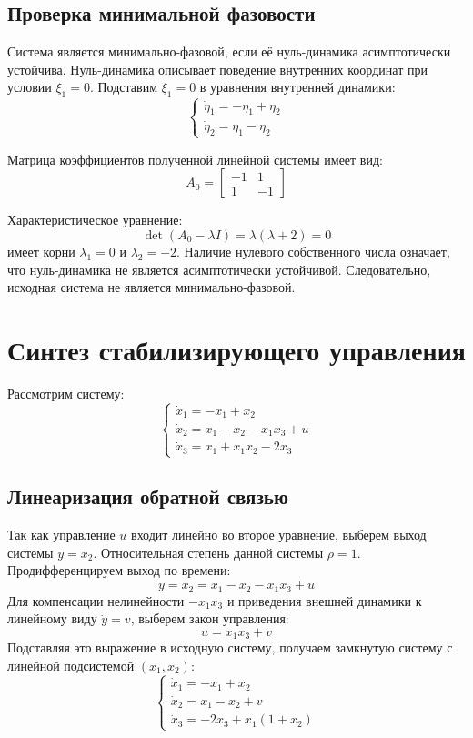 \documentclass[a4paper,12pt]{article}
\begin{document}
\subsection{Проверка минимальной фазовости}

Система является минимально-фазовой, если её нуль-динамика асимптотически устойчива. Нуль-динамика описывает поведение внутренних координат при условии $\xi_1 = 0$. Подставим $\xi_1 = 0$ в уравнения внутренней динамики:
\begin{equation}
	\begin{cases}
		\dot{\eta}_1 = -\eta_1 + \eta_2 \\
		\dot{\eta}_2 = \eta_1 - \eta_2
	\end{cases}
\end{equation}

Матрица коэффициентов полученной линейной системы имеет вид:
$$ A_0 = \begin{bmatrix} -1 & 1 \\ 1 & -1 \end{bmatrix} $$

Характеристическое уравнение: $$\det(A_0 - \lambda I) = \lambda(\lambda + 2) = 0$$ имеет корни $\lambda_1 = 0$ и $\lambda_2 = -2$. Наличие нулевого собственного числа означает, что нуль-динамика не является асимптотически устойчивой. Следовательно, исходная система не является минимально-фазовой.


\section{Синтез стабилизирующего управления}

Рассмотрим систему:
\begin{equation}
	\begin{cases}
		\dot{x}_1 = -x_1 + x_2 \\
		\dot{x}_2 = x_1 - x_2 - x_1 x_3 + u \\
		\dot{x}_3 = x_1 + x_1 x_2 - 2x_3
	\end{cases}
\end{equation}

\subsection{Линеаризация обратной связью}
Так как управление $u$ входит линейно во второе уравнение, выберем выход системы $y = x_2$. Относительная степень данной системы $\rho = 1$. Продифференцируем выход по времени:
$$ \dot{y} = \dot{x}_2 = x_1 - x_2 - x_1 x_3 + u $$
Для компенсации нелинейности $-x_1 x_3$ и приведения внешней динамики к линейному виду $\dot{y} = v$, выберем закон управления:
$$ u = x_1 x_3 + v $$
Подставляя это выражение в исходную систему, получаем замкнутую систему с линейной подсистемой $(x_1, x_2)$:
\begin{equation}
	\begin{cases}
		\dot{x}_1 = -x_1 + x_2 \\
		\dot{x}_2 = x_1 - x_2 + v \\
		\dot{x}_3 = -2x_3 + x_1(1 + x_2)
	\end{cases}
\end{equation}
\end{document}
